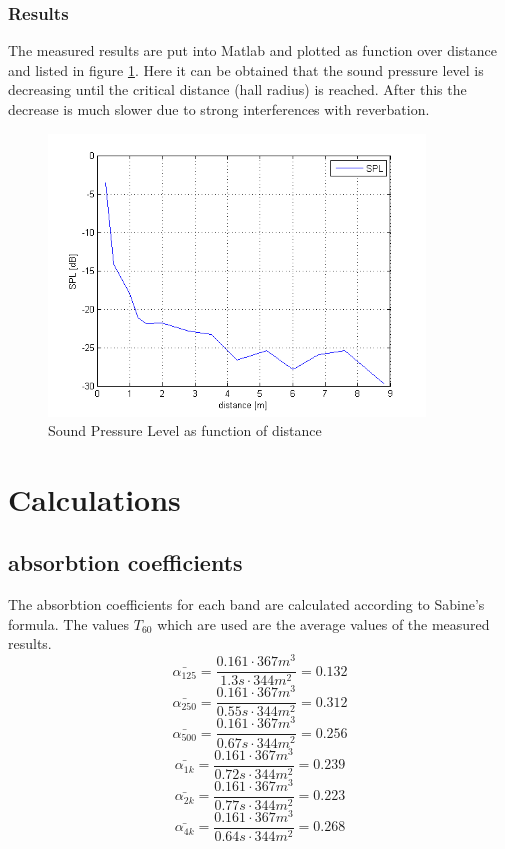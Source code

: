 \documentclass{article}
\begin{document}
\subsubsection{Results}
The measured results are put into Matlab and plotted as function over distance and listed in figure \ref{fig:spl}. Here it can be obtained that the sound pressure level is decreasing until the critical distance (hall radius) is reached. After this the decrease is much slower due to strong interferences with reverbation.
\begin{figure}[htbp]
\begin{center}
\includegraphics[width=10cm,keepaspectratio=true]{SPL}
\caption{Sound Pressure Level as function of distance}
\label{fig:spl}
\end{center}
\end{figure}

\newpage
\section{Calculations}
\subsection{absorbtion coefficients}
The absorbtion coefficients for each band are calculated according to Sabine's formula. The values $T_{60}$ which are used are the average values of the measured results. 
$$\bar{\alpha_{125}}=\frac{0.161\cdot 367m^3}{1.3s\cdot 344m^2}=0.132$$
$$\bar{\alpha_{250}}=\frac{0.161\cdot 367m^3}{0.55s\cdot 344m^2}=0.312$$
$$\bar{\alpha_{500}}=\frac{0.161\cdot 367m^3}{0.67s\cdot 344m^2}=0.256$$
$$\bar{\alpha_{1k}}=\frac{0.161\cdot 367m^3}{0.72s\cdot 344m^2}=0.239$$
$$\bar{\alpha_{2k}}=\frac{0.161\cdot 367m^3}{0.77s\cdot 344m^2}=0.223$$
$$\bar{\alpha_{4k}}=\frac{0.161\cdot 367m^3}{0.64s\cdot 344m^2}=0.268$$
\end{document}
